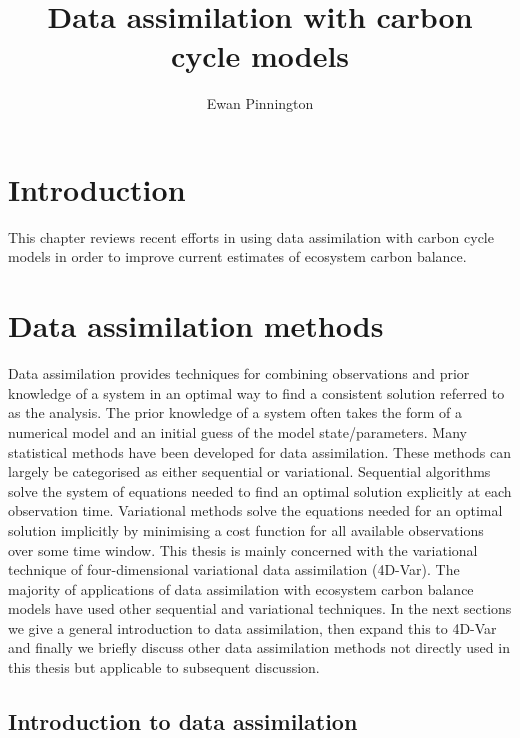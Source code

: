 \documentclass[12pt]{article}
\title{Data assimilation with carbon cycle models}
\author{Ewan Pinnington}
\begin{document}
\maketitle

\section{Introduction}

This chapter reviews recent efforts in using data assimilation with carbon cycle models in order to improve current estimates of ecosystem carbon balance.

\section{Data assimilation methods}

Data assimilation provides techniques for combining observations and prior knowledge of a system in an optimal way to find a consistent solution referred to as the analysis. The prior knowledge of a system often takes the form of a numerical model and an initial guess of the model state/parameters. Many statistical methods have been developed for data assimilation. These methods can largely be categorised as either sequential or variational. Sequential algorithms solve the system of equations needed to find an optimal solution explicitly at each observation time. Variational methods solve the equations needed for an optimal solution implicitly by minimising a cost function for all available observations over some time window. This thesis is mainly concerned with the variational technique of four-dimensional variational data assimilation (4D-Var). The majority of applications of data assimilation with ecosystem carbon balance models have used other sequential and variational techniques. In the next sections we give a general introduction to data assimilation, then expand this to 4D-Var and finally we briefly discuss other data assimilation methods not directly used in this thesis but applicable to subsequent discussion. 

\subsection{Introduction to data assimilation}
\end{document}

